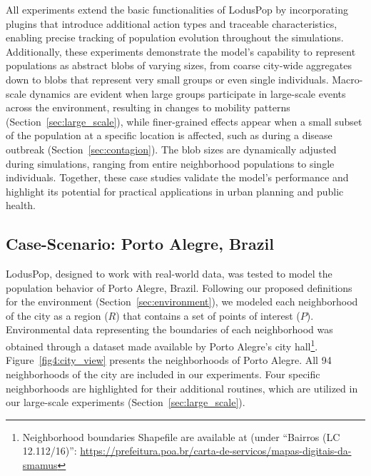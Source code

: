 \documentclass[pdflatex,sn-mathphys-num]{sn-jnl}%
\newcommand\redb[1]{#1}
\theoremstyle{thmstyleone}%
\theoremstyle{thmstyletwo}%
\theoremstyle{thmstylethree}%
\begin{document}
All experiments extend the basic functionalities of LodusPop by incorporating plugins that introduce additional action types and traceable characteristics, enabling precise tracking of population evolution throughout the simulations.
\redb{Additionally, these experiments demonstrate the model’s capability to represent populations as abstract blobs of varying sizes, from coarse city-wide aggregates down to blobs that represent very small groups or even single individuals. Macro-scale dynamics are evident when large groups participate in large-scale events across the environment, resulting in changes to mobility patterns (Section~\ref{sec:large_scale}), while finer-grained effects appear when a small subset of the population at a specific location is affected, such as during a disease outbreak (Section~\ref{sec:contagion}).}
The blob sizes are dynamically adjusted during simulations, ranging from entire neighborhood populations to single individuals. 
Together, these case studies validate the model’s performance and highlight its potential for practical applications in urban planning and public health.

\subsection{Case-Scenario: Porto Alegre, Brazil}
\label{sec:case_scenario}

LodusPop, designed to work with real-world data, was tested to model the population behavior of Porto Alegre, Brazil. Following our proposed definitions for the environment (Section~\ref{sec:environment}), we modeled each neighborhood of the city as a region ($R$) that contains a set of points of interest ($P$). 
Environmental data representing the boundaries of each neighborhood was obtained through a dataset made available by Porto Alegre's city hall\footnote{Neighborhood boundaries Shapefile are available at (under ``Bairros (LC 12.112/16)'': \url{https://prefeitura.poa.br/carta-de-servicos/mapas-digitais-da-smamus}}.
Figure~\ref{fig4:city_view} presents the neighborhoods of Porto Alegre. All 94 neighborhoods of the city are included in our experiments. Four specific neighborhoods are highlighted for their additional routines, which are utilized in our large-scale experiments (Section~\ref{sec:large_scale}).
\end{document}
